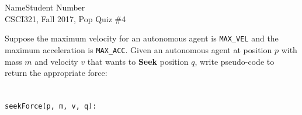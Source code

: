 \documentclass{article}
\begin{document}
Name\hrulefill Student Number\hrulefill \\
CSCI321, Fall 2017, Pop Quiz \#4

Suppose the maximum velocity for an autonomous agent is \verb|MAX_VEL|
and the maximum acceleration is \verb|MAX_ACC|.
Given an autonomous agent at position $p$ with mass $m$ and velocity $v$
that wants to {\bf Seek} position $q$, write pseudo-code to return the
appropriate force:
\\
\\
\\
{\tt seekForce(p, m, v, q):}
\end{document}
